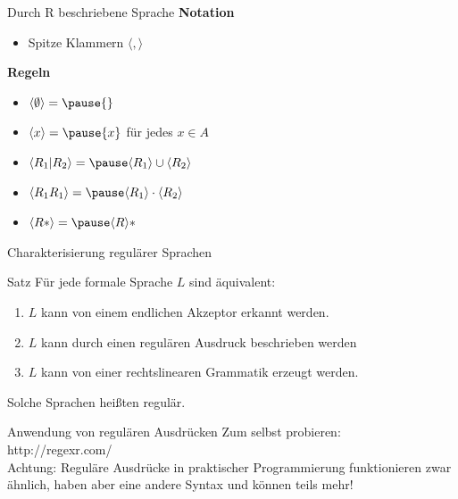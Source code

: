 \documentclass{beamer}
\begin{document}
\begin{frame}{Durch R beschriebene Sprache}
\textbf{Notation}\\
\begin{itemize}
\item Spitze Klammern $\langle , \rangle$
\end{itemize}

\pause

\textbf{Regeln}\\
\begin{itemize}
\item $\langle \emptyset \rangle = \pause \{\}$ \pause
\item $\langle x \rangle = \pause \{x\}$ für jedes $x \in A$ \pause
\item $\langle R_1| R_2\rangle = \pause \langle R_1\rangle \cup \langle R_2\rangle$ \pause
\item $\langle R_1 R_1 \rangle = \pause \langle R_1 \rangle \cdot \langle R_2 \rangle$ \pause
\item $\langle R* \rangle = \pause \langle R \rangle *$
\end{itemize}
\end{frame}

\begin{frame}{Charakterisierung regulärer Sprachen}
\begin{block}{Satz}
Für jede formale Sprache $L$ sind äquivalent:
\begin{enumerate}
\item $L$ kann von einem endlichen Akzeptor erkannt werden.
\item $L$ kann durch einen regulären Ausdruck beschrieben werden
\item $L$ kann von einer rechtslinearen Grammatik erzeugt werden.
\end{enumerate}
Solche Sprachen heißten regulär.
\end{block}
\end{frame}

\begin{frame}{Anwendung von regulären Ausdrücken}
\vfill \centering Zum selbst probieren:\\http://regexr.com/\\\vspace{.2cm}Achtung: Reguläre Ausdrücke in praktischer Programmierung funktionieren zwar ähnlich, haben aber eine andere Syntax und können teils mehr!\vfill
\end{frame}
\end{document}
